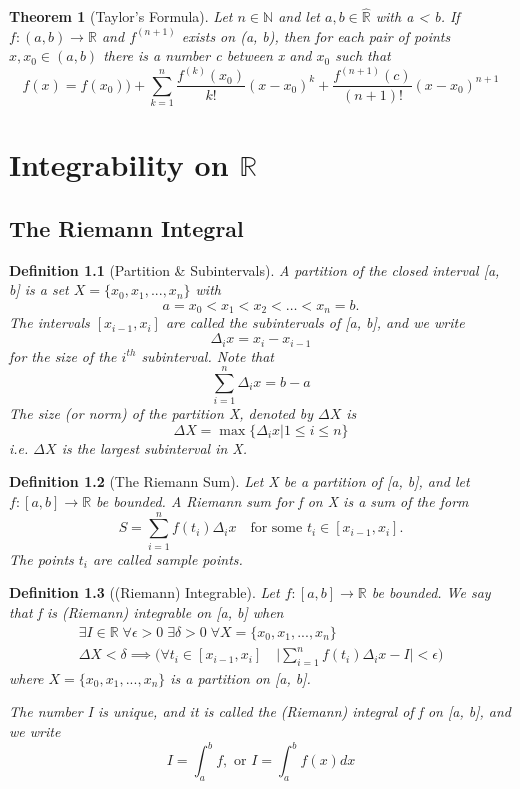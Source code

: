 \documentclass[11pt, oneside]{book}
\theoremstyle{break}
\newtheorem{thm}{Theorem}[section]
\newtheorem{defn}{Definition}[section]
\newcommand{\bb}[1]{\mathbb{#1}}		%
\begin{document}
\begin{thm}[Taylor's Formula]
	Let $n \in \bb{N}$ and let $a ,b \in \hat{\bb{R}}$ with a < b. If $f: (a, b) \to \bb{R}$ and $f^{(n + 1)}$ exists on (a, b), then for each pair of points $x, x_0 \in (a, b)$ there is a number c between x and $x_0$ such that
	\[
		f(x) = f(x_0)) + \sum_{k=1}^{n}\frac{f^{(k)} (x_0)}{k!}(x - x_0)^k + \frac{f^{(n + 1)}(c)}{(n + 1)!}(x - x_0)^{n + 1}
	\]
\end{thm}

\chapter{Integrability on \texorpdfstring{$\bb{R}$}{R}}

\section{The Riemann Integral}

\begin{defn}[Partition \& Subintervals]
	A partition of the closed interval [a, b] is a set $X = \{x_0, x_1, ..., x_n\}$ with
	\[
		a = x_0 < x_1 < x_2 < \hdots < x_n = b.
	\]
	The intervals $[x_{i-1}, x_i]$ are called the subintervals of [a, b], and we write
	\[
		\Delta_i x = x_i - x_{i-1}
	\]
	for the size of the $i^{th}$ subinterval. Note that
	\[
		\sum_{i=1}^{n} \Delta_i x = b - a
	\]
	The size (or norm) of the partition X, denoted by $\Delta X$ is
	\[
		\Delta X = \max \{\Delta_i x | 1 \leq i \leq n\}
	\]
	i.e. $\Delta X$ is the largest subinterval in X.
\end{defn}

\begin{defn}[The Riemann Sum]
	Let X be a partition of [a, b], and let $f: [a, b] \to \bb{R}$ be bounded. A Riemann sum for f on X is a sum of the form
	\[
		S = \sum_{i=1}^{n} f(t_i) \Delta_i x \quad \text{for some } t_i \in [x_{i - 1}, x_i].
	\]
	The points $t_i$ are called sample points.
\end{defn}

\begin{defn}[(Riemann) Integrable]
	Let $f: [a, b] \to \bb{R}$ be bounded. We say that f is (Riemann) integrable on [a, b] when
	\begin{gather*}
		\exists I \in \bb{R} \; \forall \epsilon > 0 \; \exists \delta > 0 \; \forall X = \{x_0, x_1, ..., x_n\} \\
		\Delta X < \delta \implies \bigg(\forall t_i \in [x_{i -1}, x_i] \quad \Bigg|\sum_{i=1}^{n} f(t_i) \Delta_i x - I \Bigg| < \epsilon \bigg)
	\end{gather*}
	where $X = \{x_0, x_1, ..., x_n\}$ is a partition on [a, b].

	The number I is unique, and it is called the (Riemann) integral of f on [a, b], and we write
	\[
		I = \int_{a}^{b} f, \text{ or } I = \int_{a}^{b} f(x) dx
	\]
\end{defn}
\end{document}
